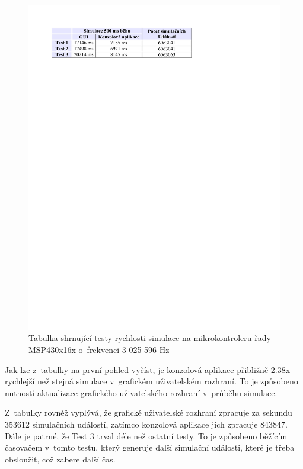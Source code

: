 \begin{figure}[ht]
\centering
\includegraphics[trim=0cm 23.5cm 2cm 2cm]{fig/tabulka1}
\caption{Tabulka shrnující testy rychlosti simulace na mikrokontroleru řady MSP430x16x o~frekvenci 3 025 596 Hz}
\label{fig:tabulka1}
\end{figure}

Jak lze z~tabulky na první pohled vyčíst, je konzolová aplikace přibližně 2.38x rychlejší než stejná simulace v~grafickém uživatelském rozhraní. To je způsobeno nutností aktualizace grafického uživatelského rozhraní v~průběhu simulace.

Z~tabulky rovněž vyplývá, že grafické uživatelské rozhraní zpracuje za sekundu 353612 simulačních událostí, zatímco konzolová aplikace jich zpracuje 843847. Dále je patrné, že Test 3 trval déle než ostatní testy. To je způsobeno běžícím časovačem v~tomto testu, který generuje další simulační události, které je třeba obsloužit, což zabere další čas.

